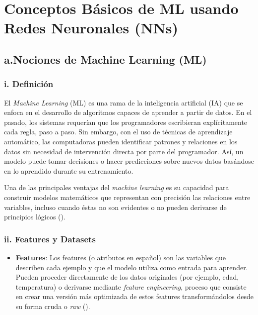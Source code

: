 \documentclass[11pt]{article} %
\begin{document}
\newpage
{\section{Conceptos Básicos de ML usando Redes Neuronales (NNs)}} \vspace{10pt}

\subsection{a.Nociones de Machine Learning (ML)}
\vspace{5pt}

\subsubsection{i. Definición} 
\vspace{3pt}

El \textit{Machine Learning} (ML) es una rama de la inteligencia artificial (IA) que se enfoca en el desarrollo de algoritmos capaces de aprender a partir de datos. En el pasado, los sistemas requerían que los programadores escribieran explícitamente cada regla, paso a paso. Sin embargo, con el uso de técnicas de aprendizaje automático, las computadoras pueden identificar patrones y relaciones en los datos sin necesidad de intervención directa por parte del programador. Así, un modelo puede tomar decisiones o hacer predicciones sobre nuevos datos basándose en lo aprendido durante su entrenamiento.

Una de las principales ventajas del \textit{machine learning} es su capacidad para construir modelos matemáticos que representan con precisión las relaciones entre variables, incluso cuando éstas no son evidentes o no pueden derivarse de principios lógicos (\cite{amazon2024}).




\vspace{8pt}
\subsubsection{ii. Features y Datasets}\vspace{2pt}
\begin{itemize}
\item \textbf{Features}: Los features (o atributos en español) son las variables que describen cada ejemplo y que el modelo utiliza como entrada para aprender. Pueden proceder directamente de los datos originales (por ejemplo, edad, temperatura) o derivarse mediante \textit{feature engineering}, proceso que consiste en crear una versión más optimizada de estos features transformándolos desde su forma cruda o \textit{raw} (\cite{googleML2025}).
\end{itemize}
\end{document}
